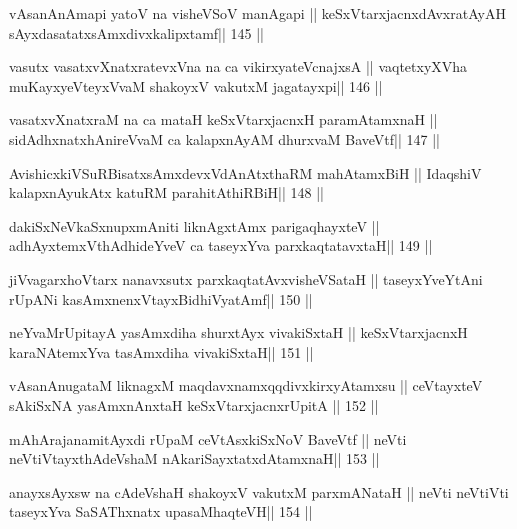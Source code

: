 \begin{shl}
vAsanAnAmapi yatoV na visheVSoV manAgapi ||
keSxVtarxjacnxdAvxratAyAH sAyxdasatatxsAmxdivxkalipxtamf\hfill || 145 ||
\end{shl}

\begin{shl}
vasutx vasatxvXnatxratevxVna na ca vikirxyateV\s cnajxsA ||
vaqtetxyXVha muKayxyeVteyxVvaM shakoyxV vakutxM jagatayxpi\hfill || 146 ||
\end{shl}

\begin{shl}
vasatxvXnatxraM na ca mataH keSxVtarxjacnxH paramAtamxnaH ||
sidAdhxnatxhAnireVvaM ca kalapxnAyAM dhurxvaM BaveVtf\hfill || 147 ||
\end{shl}

\begin{shl}
AvishicxkiVSuRBisatxsAmxdevxVdAnAtxthaRM mahAtamxBiH ||
IdaqshiV kalapxnA\s yukAtx katuRM parahitAthiRBiH\hfill || 148 ||
\end{shl}

\begin{shl}
dakiSxNeV\s kaSxnupxmAniti liknAgxtAmx parigaqhayxteV ||
adhAyxtemxV\s thAdhideYveV ca taseyxYva parxkaqtatavxtaH\hfill || 149 ||
\end{shl}

\begin{shl}
jiVvagarxhoV\s tarx nanavxsutx parxkaqtatAvxvisheVSataH ||
taseyxYveYtAni rUpANi kasAmxnenxVtayxBidhiVyatAmf\hfill || 150 ||
\end{shl}

\begin{shl}
neYvaMrUpitayA yasAmxdiha shurxtAyx vivakiSxtaH ||
keSxVtarxjacnxH karaNAtemxYva tasAmxdiha vivakiSxtaH\hfill || 151 ||
\end{shl}

\begin{shl}
vAsanAnugataM liknagxM maqdavxnamxqqdivxkirxyAtamxsu ||
ceVtayxteV sAkiSxNA yasAmxnAnxtaH keSxVtarxjacnxrUpitA \hfill || 152 ||
\end{shl}

\begin{shl}
mAhArajanamitAyxdi rUpaM ceVtAsxkiSxNoV BaveVtf ||
neVti neVtiVtayxthA\s\s deVshaM nAkariSayxtatxdA\s\s tamxnaH\hfill || 153 ||
\end{shl}

\begin{shl}
anayxsAyxsw na cA\s\s deVshaH shakoyxV vakutxM parxmANataH ||
neVti neVtiVti taseyxYva SaSAThxnatx upasaMhaqteVH\hfill || 154 ||
\end{shl}

